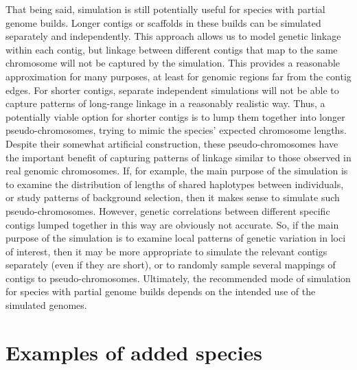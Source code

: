 \documentclass[hidelinks]{article}
\makeatletter
\newcommand{\stdpopsim}{\texttt{stdpopsim}\xspace}
\newcommand{\labelname}[1]{\def\@currentlabelname{#1}}
\makeatother
\begin{document}
That being said, simulation is still potentially useful for species with partial genome builds.
Longer contigs or scaffolds in these builds can be simulated separately and independently.
This approach allows us to model genetic linkage within each contig,
but linkage between different contigs that map to the same chromosome will not be captured by the simulation.
This provides a reasonable approximation for many purposes, at least for genomic regions far from the contig edges.
For shorter contigs, separate independent simulations will not be able to capture patterns of long-range linkage in a reasonably realistic way.
Thus, a potentially viable option for shorter contigs is to lump them together into longer pseudo-chromosomes, trying to mimic the species' expected chromosome lengths.
Despite their somewhat artificial construction,
these pseudo-chromosomes have the important benefit of
capturing patterns of linkage similar to those observed in real genomic chromosomes.
If, for example, the main purpose of the simulation is to examine the distribution of lengths of shared haplotypes between individuals,
or study patterns of background selection,
then it makes sense to simulate such pseudo-chromosomes.
However, genetic correlations between different specific contigs lumped together in this way are obviously not accurate.
So, if the main purpose of the simulation is to examine local patterns of genetic variation in loci of interest, then it may be more appropriate to simulate the relevant contigs separately (even if they are short), or to randomly sample several mappings of contigs to pseudo-chromosomes.
Ultimately, the recommended mode of simulation for species with partial genome builds depends on the intended use of the simulated genomes.

\section*{Examples of added species}
    \labelname{Examples}
    \label{sec:examples}
\end{document}
